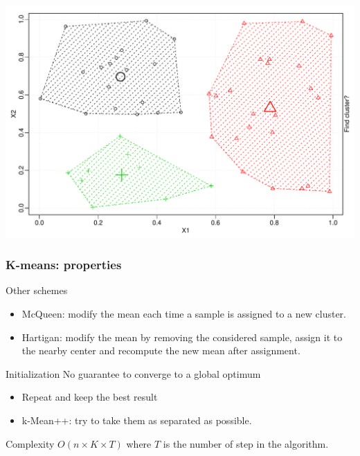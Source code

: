 \documentclass{beamer}\usepackage[]{graphicx}\usepackage[]{color}
\newenvironment{knitrout}{}{} %
\begin{document}
\begin{frame}
\begin{knitrout}
\includegraphics[width=.8\textwidth]{figures/unnamed-chunk-1-8} 

\end{knitrout}

\end{frame}

\begin{frame}
\frametitle{K-means: properties}
  
  \begin{block}{Other schemes}
    \begin{itemize}
      \item \alert{McQueen}: modify the mean each time a sample is assigned to a new cluster.
      \item \alert{Hartigan}: modify the mean by removing the considered sample, assign it to the nearby center and recompute the new mean after assignment.
    \end{itemize}
  \end{block}
  
  \begin{block}{Initialization}
    No guarantee to converge to a global optimum
    \begin{itemize}
      \item Repeat and keep the best result
      \item k-Mean++: try to take them as separated as possible.
    \end{itemize}
  \end{block}

  \begin{block}{Complexity}
     $O(n \times K \times T)$ where $T$ is the number of step in the algorithm.
  \end{block}
  
\end{frame}
\end{document}
